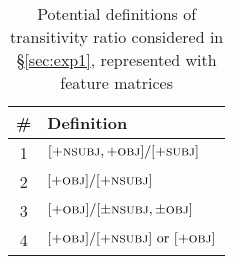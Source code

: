\begin{table}[ht]
    \centering
    \begin{tabularx}{0.5\textwidth}{cX}
    {\#} & \textbf{Definition} \\
    \hline
    1&$[+\textsc{nsubj}, +\textsc{obj}]/ [+\textsc{subj}]$ \\
    2&$[+\textsc{obj}] / [+\textsc{nsubj}]$  \\
    3&$[+\textsc{obj}] / [\pm\textsc{nsubj}, \pm\textsc{obj}]$\\
    4&$[+\textsc{obj}] / [+\textsc{nsubj}] \text{ or } [+\textsc{obj}]$
    \end{tabularx}
    \caption{Potential definitions of transitivity ratio considered in §\ref{sec:exp1}, represented with feature matrices}\label{tab:transitivity-defs}
\end{table}  